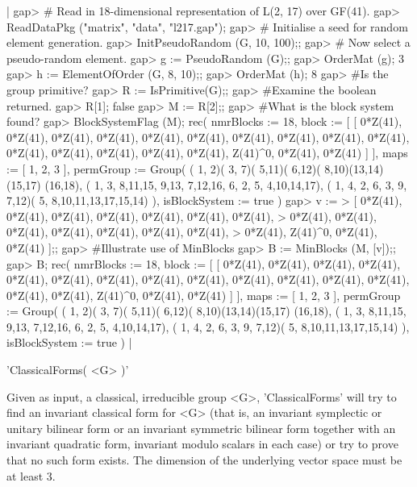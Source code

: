 |    gap> # Read in 18-dimensional representation of L(2, 17) over GF(41).
    gap> ReadDataPkg ("matrix", "data", "l217.gap");
    gap> # Initialise a seed for random element generation.
    gap> InitPseudoRandom (G, 10, 100);;
    gap> # Now select a pseudo-random element.
    gap> g := PseudoRandom (G);;
    gap> OrderMat (g);
    3
    gap> h := ElementOfOrder (G, 8, 10);;
    gap> OrderMat (h);
    8
    gap> #Is the group primitive?
    gap> R := IsPrimitive(G);;
    gap> #Examine the boolean returned.
    gap> R[1];
    false
    gap> M := R[2];;
    gap> #What is the block system found?
    gap> BlockSystemFlag (M);
    rec(
      nmrBlocks := 18,
      block := 
       [ [ 0*Z(41), 0*Z(41), 0*Z(41), 0*Z(41), 0*Z(41), 0*Z(41), 0*Z(41), 
	   0*Z(41), 0*Z(41), 0*Z(41), 0*Z(41), 0*Z(41), 0*Z(41), 0*Z(41), 
	   0*Z(41), Z(41)^0, 0*Z(41), 0*Z(41) ] ],
      maps := [ 1, 2, 3 ],
      permGroup := Group( ( 1, 2)( 3, 7)( 5,11)( 6,12)( 8,10)(13,14)(15,17)
	(16,18), ( 1, 3, 8,11,15, 9,13, 7,12,16, 6, 2, 5, 4,10,14,17), 
	( 1, 4, 2, 6, 3, 9, 7,12)( 5, 8,10,11,13,17,15,14) ),
      isBlockSystem := true )
    gap>  v :=
    > [ 0*Z(41), 0*Z(41), 0*Z(41), 0*Z(41), 0*Z(41), 0*Z(41), 0*Z(41),
    >   0*Z(41), 0*Z(41), 0*Z(41), 0*Z(41), 0*Z(41), 0*Z(41), 0*Z(41),
    >   0*Z(41), Z(41)^0, 0*Z(41), 0*Z(41) ];;
    gap> #Illustrate use of MinBlocks 
    gap> B := MinBlocks (M, [v]);;
    gap> B;
    rec(
      nmrBlocks := 18,
      block := 
       [ [ 0*Z(41), 0*Z(41), 0*Z(41), 0*Z(41), 0*Z(41), 0*Z(41), 0*Z(41),
	   0*Z(41), 0*Z(41), 0*Z(41), 0*Z(41), 0*Z(41), 0*Z(41), 0*Z(41), 
	   0*Z(41), Z(41)^0, 0*Z(41), 0*Z(41) ] ],
      maps := [ 1, 2, 3 ],
      permGroup := Group( ( 1, 2)( 3, 7)( 5,11)( 6,12)( 8,10)(13,14)(15,17)
	(16,18), ( 1, 3, 8,11,15, 9,13, 7,12,16, 6, 2, 5, 4,10,14,17), 
	( 1, 4, 2, 6, 3, 9, 7,12)( 5, 8,10,11,13,17,15,14) ),
      isBlockSystem := true ) |


'ClassicalForms( <G> )'

Given as input, a classical, irreducible group <G>, 'ClassicalForms' will
try to find  an invariant classical form for  <G> (that is, an  invariant
symplectic or  unitary bilinear form  or an  invariant symmetric bilinear
form together with an invariant  quadratic form, invariant modulo scalars
in each case) or try to prove that no such form exists.  The dimension of
the underlying vector space must be at least 3.

